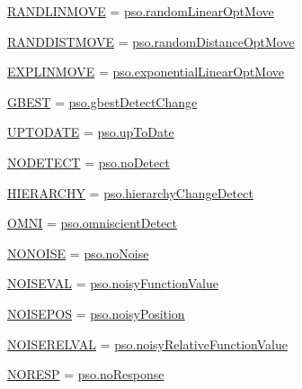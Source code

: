 \begin{CompactItemize}
\hyperlink{namespacewriteBatch_b701fe8d69ff5e14632d80e496bbe187}{RANDLINMOVE} = \hyperlink{namespacepso_99779901f17d1e9140bc84d718d3b3b5}{pso.randomLinearOptMove}
\item 
\hyperlink{namespacewriteBatch_0df0604a58fcc78b64ac617cb953769e}{RANDDISTMOVE} = \hyperlink{namespacepso_4c125c7056259833e78ecd98ab9c05f5}{pso.randomDistanceOptMove}
\item 
\hyperlink{namespacewriteBatch_510f244e239a0e64ed398d02d8ff5ee8}{EXPLINMOVE} = \hyperlink{namespacepso_45a31f10e8595a3d9ac89f76b52886e5}{pso.exponentialLinearOptMove}
\item 
\hyperlink{namespacewriteBatch_79ca84adf784b883797915bd8081eddd}{GBEST} = \hyperlink{namespacepso_f18f59b20d4081e64b956a3c8f29105e}{pso.gbestDetectChange}
\item 
\hyperlink{namespacewriteBatch_708716cca268bb4d33911a26224d82d6}{UPTODATE} = \hyperlink{namespacepso_95c63d6d8e2181f3dc0b9598a79e2fb0}{pso.upToDate}
\item 
\hyperlink{namespacewriteBatch_2032d53d4771b6c9f1ea0f736c5dc6aa}{NODETECT} = \hyperlink{namespacepso_63d8c94d27a1b7f25a242b57aff4db7a}{pso.noDetect}
\item 
\hyperlink{namespacewriteBatch_8ca5412945122ecfdc60231b4ad91d9f}{HIERARCHY} = \hyperlink{namespacepso_60e0f19620ff2a24b6d22562d73ebd1c}{pso.hierarchyChangeDetect}
\item 
\hyperlink{namespacewriteBatch_03e2361269a5fae88047e7ace1c349c7}{OMNI} = \hyperlink{namespacepso_3106bad52a9716cf52ddb62db8035aa3}{pso.omniscientDetect}
\item 
\hyperlink{namespacewriteBatch_390a319f2aec5babfcfd9c8799007416}{NONOISE} = \hyperlink{namespacepso_3ed42a0d68c0db8bc6613d3b4b1821ed}{pso.noNoise}
\item 
\hyperlink{namespacewriteBatch_eb1a87e2345e26dfbf8add245e7021bf}{NOISEVAL} = \hyperlink{namespacepso_959d295f481209db162c45ce9ebbd007}{pso.noisyFunctionValue}
\item 
\hyperlink{namespacewriteBatch_0328e8a59e5b37ac6d77727ca4980dca}{NOISEPOS} = \hyperlink{namespacepso_a00e8f003f68f505474c2c3897092722}{pso.noisyPosition}
\item 
\hyperlink{namespacewriteBatch_ce654c85b31898bdc26edd4cbdb36147}{NOISERELVAL} = \hyperlink{namespacepso_d1b7b834516afd0c08c36d0f4726de88}{pso.noisyRelativeFunctionValue}
\item 
\hyperlink{namespacewriteBatch_cd404661b17313e90d486c3c530bb5f1}{NORESP} = \hyperlink{namespacepso_58d899f781247c69ee071e1117ded9b2}{pso.noResponse}

\end{CompactItemize}
